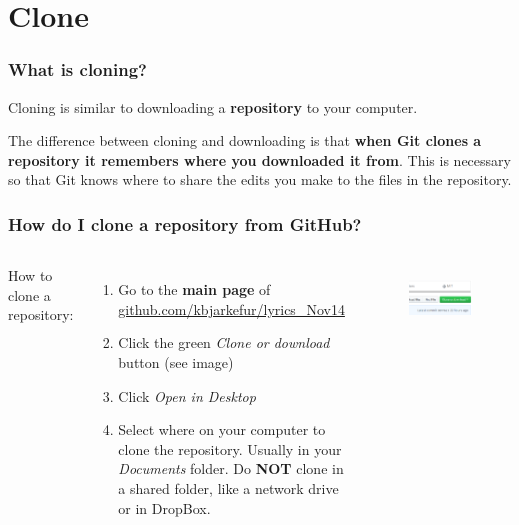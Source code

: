 \documentclass[aspectratio=169]{beamer} %
\newcommand{\trainingURL}[1]{{\color{blue}\url{#1}}}
\newcommand{\traininerUsername}{kbjarkefur}
\newcommand{\repoName}{\traininerUsername/lyrics\_Nov14}
\newcommand{\trainingRepoURL}[1]{\trainingURL{github.com/\repoName #1}}
\begin{document}
\section{Clone}

\begin{frame}
\frametitle{What is cloning?}
	
	Cloning is similar to downloading a \textbf{repository} to your computer.
	
	\vspace{.5cm}
	
	The difference between cloning and downloading is that \textbf{when Git clones a repository it remembers where you downloaded it from}. This is necessary so that Git knows where to share the edits you make to the files in the repository.
	
\end{frame}

\begin{frame}
\frametitle{How do I clone a repository from GitHub?}
	
	\begin{columns}[c] 
		
		How to clone a repository:
		\begin{enumerate}
			\item Go to the \textbf{main page} of \trainingRepoURL{}
			\item Click the green \textit{Clone or download} button (see image)
			\item Click \textit{Open in Desktop}
			\item Select where on your computer to clone the repository. Usually in your \textit{Documents} folder. Do \textbf{NOT} clone in a shared folder, like a network drive or in DropBox. 
		\end{enumerate}
		
		\begin{figure}
			\centering
			\includegraphics[width=1\linewidth]{img/clonedownload_button}
			\label{fig:clonedownloadbutton}
		\end{figure}
	
	\end{columns}

\end{frame}
\end{document}
